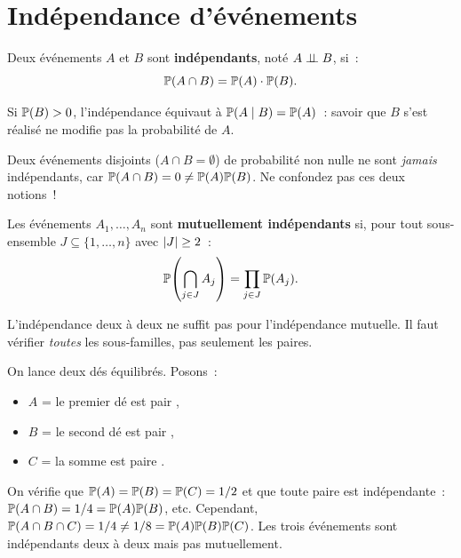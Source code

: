 \section{Ind\'ependance d'\'ev\'enements}

\begin{definition}
Deux \'ev\'enements $A$ et $B$ sont \textbf{ind\'ependants}, not\'e
$A \perp\!\!\!\perp B$, si~:
\[
    \mathbb{P}(A \cap B) = \mathbb{P}(A) \cdot \mathbb{P}(B).
\]
\end{definition}

\begin{remarque}
Si $\mathbb{P}(B) > 0$, l'ind\'ependance \'equivaut \`a $\mathbb{P}(A \mid B) = \mathbb{P}(A)$~:
savoir que $B$ s'est r\'ealis\'e ne modifie pas la probabilit\'e de $A$.
\end{remarque}

\begin{attention}[title=\textbf{Ind\'ependance $\neq$ incompatibilit\'e}]
Deux \'ev\'enements disjoints ($A \cap B = \emptyset$) de probabilit\'e non nulle
ne sont \emph{jamais} ind\'ependants, car $\mathbb{P}(A \cap B) = 0 \neq \mathbb{P}(A)\mathbb{P}(B)$.
Ne confondez pas ces deux notions~!
\end{attention}

\begin{definition}
Les \'ev\'enements $A_1, \ldots, A_n$ sont \textbf{mutuellement ind\'ependants}
si, pour tout sous-ensemble $J \subseteq \{1, \ldots, n\}$ avec $\left| J \right| \geq 2$~:
\[
    \mathbb{P}\!\left(\bigcap_{j \in J} A_j\right) = \prod_{j \in J} \mathbb{P}(A_j).
\]
\end{definition}

\begin{attention}[title=\textbf{Ind\'ependance deux \`a deux $\neq$ mutuelle}]
L'ind\'ependance deux \`a deux ne suffit pas pour l'ind\'ependance mutuelle.
Il faut v\'erifier \emph{toutes} les sous-familles, pas seulement les paires.
\end{attention}

\begin{exemple}
On lance deux d\'es \'equilibr\'es. Posons~:
\begin{itemize}
    \item $A$ = \og le premier d\'e est pair \fg,
    \item $B$ = \og le second d\'e est pair \fg,
    \item $C$ = \og la somme est paire \fg.
\end{itemize}
On v\'erifie que $\mathbb{P}(A) = \mathbb{P}(B) = \mathbb{P}(C) = 1/2$ et que toute paire est
ind\'ependante~: $\mathbb{P}(A \cap B) = 1/4 = \mathbb{P}(A)\mathbb{P}(B)$, etc. Cependant,
$\mathbb{P}(A \cap B \cap C) = 1/4 \neq 1/8 = \mathbb{P}(A)\mathbb{P}(B)\mathbb{P}(C)$.
Les trois \'ev\'enements sont ind\'ependants deux \`a deux mais pas mutuellement.
\end{exemple}

